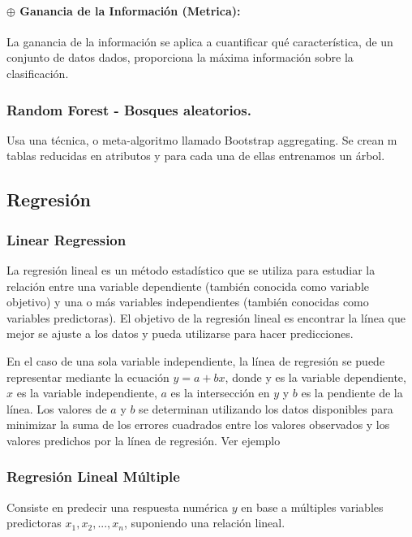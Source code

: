 \documentclass[../main.tex]{subfiles}
\begin{document}
            \paragraph{$\oplus$ Ganancia de la Información (Metrica):}
                La ganancia de la información se aplica a cuantificar qué característica, de un conjunto de datos dados, proporciona la máxima información sobre la clasificación.
                
        
        \subsubsection{Random Forest - Bosques aleatorios.}
            Usa una técnica, o meta-algoritmo llamado Bootstrap aggregating. Se crean m tablas reducidas en atributos y para cada una de ellas entrenamos un árbol.
            
    \subsection{Regresión}
        \subsubsection{Linear Regression}
            La regresión lineal es un método estadístico que se utiliza para estudiar la relación entre una variable dependiente (también conocida como variable objetivo) y una o más variables independientes (también conocidas como variables predictoras). El objetivo de la regresión lineal es encontrar la línea que mejor se ajuste a los datos y pueda utilizarse para hacer predicciones.
        
            En el caso de una sola variable independiente, la línea de regresión se puede representar mediante la ecuación $y = a + bx$, donde y es la variable dependiente, $x$ es la variable independiente, $a$ es la intersección en $y$ y $b$ es la pendiente de la línea. Los valores de $a$ y $b$ se determinan utilizando los datos disponibles para minimizar la suma de los errores cuadrados entre los valores observados y los valores predichos por la línea de regresión. Ver ejemplo %
            
        \subsubsection{Regresión Lineal Múltiple}
            Consiste en predecir una respuesta numérica $y$ en base a múltiples variables predictoras $x_1, x_2, ..., x_n $, suponiendo una relación lineal. 
		
\end{document}
